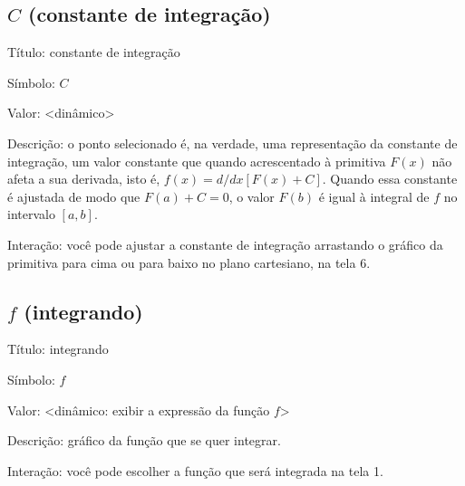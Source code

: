 \documentclass[a4paper,10pt]{scrartcl}
\begin{document}
  \subsection*{$C$ (constante de integração)}
    \begin{compactdesc}
	\item{Título:} constante de integração
	\item{Símbolo:} $C$
	\item{Valor:} <dinâmico>
	\item{Descrição:} o ponto selecionado é, na verdade, uma representação da constante de integração, um valor constante que quando acrescentado à primitiva $F(x)$ não afeta a sua derivada, isto é, $f(x) = d/dx [F(x)+C]$. Quando essa constante é ajustada de modo que $F(a) + C = 0$, o valor $F(b)$ é igual à integral de $f$ no intervalo $[a,b]$.
	\item{Interação:} você pode ajustar a constante de integração arrastando o gráfico da primitiva para cima ou para baixo no plano cartesiano, na tela 6.
    \end{compactdesc}
    
  \subsection*{$f$ (integrando)}
    \begin{compactdesc}
	\item{Título:} integrando
	\item{Símbolo:} $f$
	\item{Valor:} <dinâmico: exibir a expressão da função $f$>
	\item{Descrição:} gráfico da função que se quer integrar.
	\item{Interação:} você pode escolher a função que será integrada na tela 1.
    \end{compactdesc}
    
  \newpage
    
\end{document}

